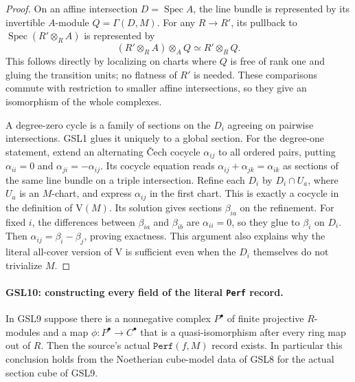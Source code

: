 \documentclass[11pt,a4paper]{article}
\numberwithin{equation}{section}
\theoremstyle{remark}\newtheorem{remark}[theorem]{Remark}
\begin{document}
\begin{proof}
On an affine intersection $D=\operatorname{Spec}A$, the line bundle
is represented by its invertible $A$-module $Q=\Gamma(D,M)$.
For any $R\to R'$, its pullback to
$\operatorname{Spec}(R'\otimes_R A)$ is represented by
\[
 (R'\otimes_R A)\otimes_AQ\simeq R'\otimes_RQ.
\]
This follows directly by localizing on charts where $Q$ is free of
rank one and gluing the transition units; no flatness of $R'$ is
needed.  These comparisons commute with restriction to smaller affine
intersections, so they give an isomorphism of the whole complexes.

A degree-zero cycle is a family of sections on the $D_i$ agreeing
on pairwise intersections.  GSL1 glues it uniquely to a global
section.  For the degree-one statement, extend an alternating
\v Cech cocycle $\alpha_{ij}$ to all ordered pairs, putting
$\alpha_{ii}=0$ and $\alpha_{ji}=-\alpha_{ij}$.  Its cocycle
equation reads $\alpha_{ij}+\alpha_{jk}=\alpha_{ik}$ as sections
of the same line bundle on a triple intersection.  Refine each $D_i$
by $D_i\cap U_a$, where $U_a$ is an $M$-chart, and express
$\alpha_{ij}$ in the first chart.  This is exactly a cocycle in
the definition of $\mathrm V(M)$.  Its solution gives sections
$\beta_{ia}$ on the refinement.  For fixed $i$, the differences
between $\beta_{ia}$ and $\beta_{ib}$ are $\alpha_{ii}=0$,
so they glue to $\beta_i$ on $D_i$.  Then
$\alpha_{ij}=\beta_i-\beta_j$, proving exactness.  This argument
also explains why the literal all-cover version of $\mathrm V$
is sufficient even when the $D_i$ themselves do not trivialize $M$.
\end{proof}

\paragraph{GSL10: constructing every field of the literal \texttt{Perf} record.}
\label{claim:GSL10}
In GSL9 suppose there is a nonnegative complex $P^\bullet$ of
finite projective $R$-modules and a map
$\phi:P^\bullet\to C^\bullet$ that is a quasi-isomorphism after
every ring map out of $R$.  Then the source's actual
$\texttt{Perf}(f,M)$ record exists.  In particular this conclusion
holds from the Noetherian cube-model data of GSL8 for the actual
section cube of GSL9.
\end{document}
